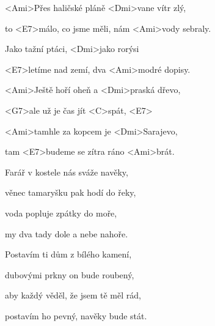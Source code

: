 

\zs
<Ami>Přes haličské pláně <Dmi>vane vítr zlý,

to <E7>málo, co jsme měli, nám <Ami>vody sebraly.

Jako tažní ptáci, <Dmi>jako rorýsi

<E7>letíme nad zemí, dva <Ami>modré dopisy.
\ks


\zr
<Ami>Ještě hoří oheň a <Dmi>praská dřevo,

<G7>ale už je čas jít <C>spát, <E7>

<Ami>tamhle za kopcem je <Dmi>Sarajevo,

tam <E7>budeme se zítra ráno <Ami>brát.
\kr

\zs
Farář v kostele nás sváže navěky,

věnec tamaryšku pak hodí do řeky,

voda popluje zpátky do moře,

my dva tady dole a nebe nahoře.
\ks

\zr \kr

\zs
Postavím ti dům z bílého kamení,

dubovými prkny on bude roubený,

aby každý věděl, že jsem tě měl rád,

postavím ho pevný, navěky bude stát.
\ks


\zr \kr

\kp





